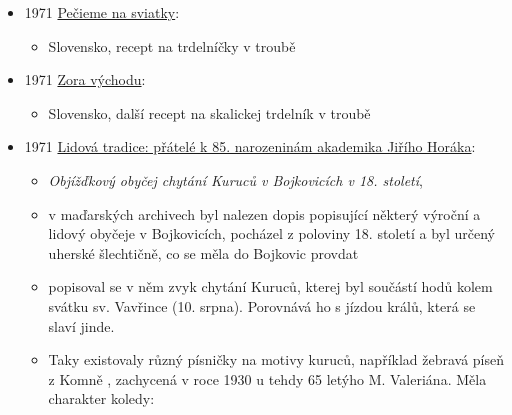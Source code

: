 \begin{itemize}
  \begin{itemize}
  \tightlist
  \item
    Valenta, Edvard
  \item
    šéfovi Heinrichovi hosté nosili co si cení, moravské klobásy,
    moravské uzené, luhačovické trdelníky, pražské taliány - nebyl
    moravský patriot, byl rodilý Pražan
  \item
    novinář vzpomíná na to, jaké to bylo psát pro Lidové noviny.
    Heinrich byl šéfredaktor v meziválečném období.
  \end{itemize}
\item
  1971
  \href{https://dikda.snk.sk/uuid/uuid:286ab1e8-9e6d-4d9e-acc5-c7a4ece3b1d4}{Pečieme
  na sviatky}:

  \begin{itemize}
  \tightlist
  \item
    Slovensko, recept na trdelníčky v troubě
  \end{itemize}
\item
  1971
  \href{https://dikda.snk.sk/uuid/uuid:7daf6367-3c66-45b1-95be-b9216087f65a}{Zora
  východu}:

  \begin{itemize}
  \tightlist
  \item
    Slovensko, další recept na skalickej trdelník v troubě
  \end{itemize}
\item
  1971
  \href{https://www.digitalniknihovna.cz/mzk/uuid/uuid:5a7c2320-b7b4-11e6-a108-005056827e51}{Lidová
  tradice: přátelé k 85. narozeninám akademika Jiřího Horáka}:

  \begin{itemize}
  \tightlist
  \item
    \emph{Objížďkový obyčej chytání Kuruců v Bojkovicích v 18. století},
  \item
    v maďarských archivech byl nalezen dopis popisující některý výroční
    a lidový obyčeje v Bojkovicích, pocházel z poloviny 18. století a
    byl určený uherské šlechtičně, co se měla do Bojkovic provdat
  \item
    popisoval se v něm zvyk chytání Kuruců, kterej byl součástí hodů
    kolem svátku sv. Vavřince (10. srpna). Porovnává ho s jízdou králů,
    která se slaví jinde.
  \item
    Taky existovaly různý písničky na motivy kuruců, například žebravá
    píseň z Komně  , zachycená v roce 1930 u
    tehdy 65 letýho M. Valeriána. Měla charakter koledy:


\end{itemize}
\end{itemize}
